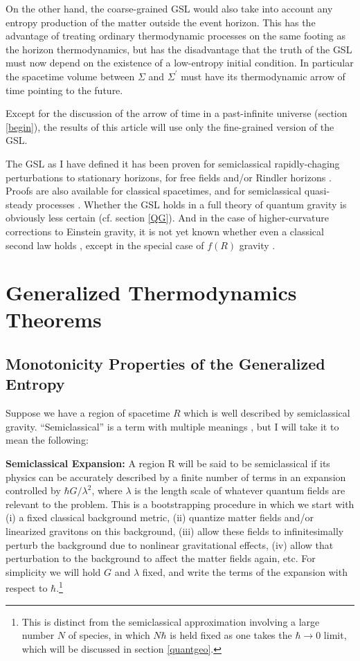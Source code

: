 \documentclass{article}
\begin{document}
On the other hand, the coarse-grained GSL would also take into account any entropy production of the matter outside the event horizon.  This has the advantage of treating ordinary thermodynamic processes on the same footing as the horizon thermodynamics, but has the disadvantage that the truth of the GSL must now depend on the existence of a low-entropy initial condition.  In particular the spacetime volume between $\Sigma$ and $\Sigma^\prime$ must have its thermodynamic arrow of time pointing to the future.  

Except for the discussion of the arrow of time in a past-infinite universe (section \ref{begin}), the results of this article will use only the fine-grained version of the GSL.

The GSL as I have defined it has been proven for semiclassical rapidly-chaging perturbations to stationary horizons, for free fields and/or Rindler horizons \cite{myproofs}.  Proofs are also available for classical spacetimes, and for semiclassical quasi-steady processes \cite{10proofs}.  Whether the GSL holds in a full theory of quantum gravity is obviously less certain (cf. section \ref{QG}).  And in the case of higher-curvature corrections to Einstein gravity, it is not yet known whether even a classical second law holds \cite{lovelock}, except in the special case of $f(R)$ gravity \cite{fR}.

\section{Generalized Thermodynamics Theorems}\label{theorems}

\subsection{Monotonicity Properties of the Generalized Entropy}

Suppose we have a region of spacetime $R$ which is well described by semiclassical gravity.  ``Semiclassical'' is a term with multiple meanings \cite{10proofs}, but I will take it to mean the following:

\textbf{Semiclassical Expansion:} A region R will be said to be semiclassical if its physics can be accurately described by a finite number of terms in an expansion controlled by $\hbar G / \lambda^2$, where $\lambda$ is the length scale of whatever quantum fields are relevant to the problem.  This is a bootstrapping procedure in which we start with (i) a fixed classical background metric, (ii) quantize matter fields and/or linearized gravitons on this background, (iii) allow these fields to infinitesimally perturb the background due to nonlinear gravitational effects, (iv) allow that perturbation to the background to affect the matter fields again, etc.  For simplicity we will hold $G$ and $\lambda$ fixed, and write the terms of the expansion with respect to $\hbar$.\footnote{This is distinct from the semiclassical approximation involving a large number $N$ of species, in which $N\hbar$ is held fixed as one takes the $\hbar \to 0$ limit, which will be discussed in section \ref{quantgeo}.}
\end{document}
